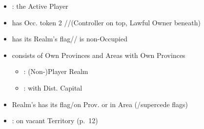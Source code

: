 \documentclass[10pt]{article}
\begin{document}
\begin{itemize}
	\item {}: the Active Player
	\item {} has Occ. token  2 \rebeltown/\town/\vassal (Controller on top, Lawful Owner beneath)
	\item {} has its Realm's flag/\town/\dnpr {} is non-Occupied
	\item {} consists of Own Provinces and Areas with Own Provinces
	\begin{itemize}
		\item {}: (Non-)Player Realm
		\item {}: with Dist. Capital
	\end{itemize}
	\item Realm's  has its flag/\dnpr on Prov. or \core in Area (\core/\dnpr supercede flags)
	\item {}: \claim on vacant Territory (p.~12)
\end{itemize}
\end{document}
